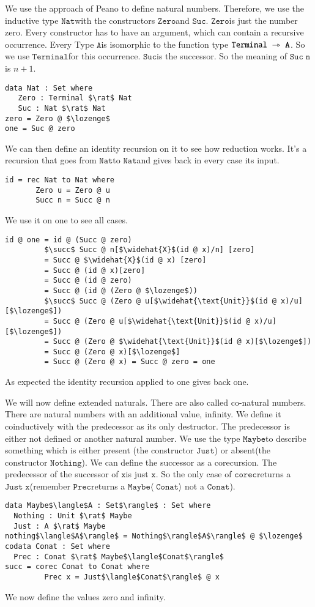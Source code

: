 \documentclass[a4paper,cleardoubleempty,BCOR1cm]{scrbook}
\begin{document}
We use the approach of Peano to define natural numbers.  Therefore, we use
the inductive type $\mathtt{Nat}$\;with the constructors $\mathtt{Zero}$\;and $\mathtt{Suc}$. $\mathtt{Zero}$\;is
just the number zero. Every constructor has to have an argument, which can
contain a recursive occurrence. Every Type $\mathtt{A}$\;is isomorphic to the
function type $\mathtt{Terminal\;\rightarrowtriangle\;A}$. So we use $\mathtt{Terminal}$\;for this occurrence.
$\mathtt{Suc}$\;is the successor. So the meaning of $\mathtt{Suc\;n}$\;is \(n+1\).
\begin{lstlisting}
data Nat : Set where
   Zero : Terminal $\rat$ Nat
   Suc : Nat $\rat$ Nat
zero = Zero @ $\lozenge$
one = Suc @ zero
\end{lstlisting}
We can then define an identity recursion on it to see how reduction works.
It's a recursion that goes from $\mathtt{Nat}$\;to $\mathtt{Nat}$\;and gives back in every
case its input.
\begin{lstlisting}
id = rec Nat to Nat where
       Zero u = Zero @ u
       Succ n = Succ @ n
\end{lstlisting}

We use it on one to see all cases.
\begin{lstlisting}
id @ one = id @ (Succ @ zero)
         $\succ$ Succ @ n[$\widehat{X}$(id @ x)/n] [zero]
         = Succ @ $\widehat{X}$(id @ x) [zero]
         = Succ @ (id @ x)[zero]
         = Succ @ (id @ zero)
         = Succ @ (id @ (Zero @ $\lozenge$))
         $\succ$ Succ @ (Zero @ u[$\widehat{\text{Unit}}$(id @ x)/u][$\lozenge$])
         = Succ @ (Zero @ u[$\widehat{\text{Unit}}$(id @ x)/u][$\lozenge$])
         = Succ @ (Zero @ $\widehat{\text{Unit}}$(id @ x)[$\lozenge$])
         = Succ @ (Zero @ x)[$\lozenge$]
         = Succ @ (Zero @ x) = Succ @ zero = one
\end{lstlisting}
As expected the identity recursion applied to one gives back one.

We will now define extended naturals. There are also called co-natural numbers.
There are natural numbers with an additional value, infinity. We define it
coinductively with the predecessor as its only destructor. The predecessor is
either not defined or another natural number. We use the type $\mathtt{Maybe}$\;to
describe something which is either present (the constructor $\mathtt{Just}$) or
absent(the constructor $\mathtt{Nothing}$). We can define the successor as a
corecursion. The predecessor of the successor of $\mathtt{x}$\;is just $\mathtt{x}$. So the only
case of $\mathtt{corec}$\;returns a $\mathtt{Just\;x}$\;(remember $\mathtt{Prec}$\;returns a $\mathtt{Maybe\langle\;Conat\rangle}$
not a $\mathtt{Conat}$).
\begin{lstlisting}
data Maybe$\langle$A : Set$\rangle$ : Set where
  Nothing : Unit $\rat$ Maybe
  Just : A $\rat$ Maybe
nothing$\langle$A$\rangle$ = Nothing$\rangle$A$\rangle$ @ $\lozenge$
codata Conat : Set where
  Prec : Conat $\rat$ Maybe$\langle$Conat$\rangle$
succ = corec Conat to Conat where
         Prec x = Just$\langle$Conat$\rangle$ @ x
\end{lstlisting}
We now define the values zero and infinity.
\end{document}
